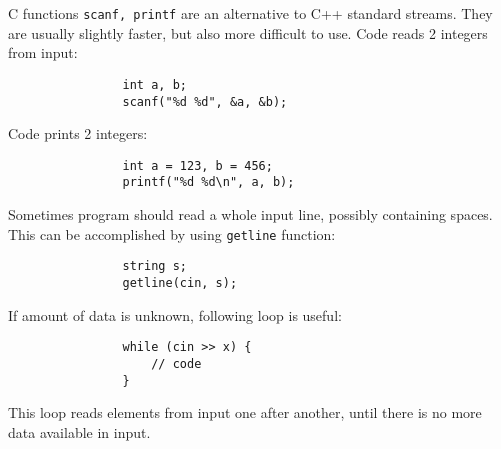 \documentclass{article}
\begin{document}
\begin{itemize}
\begin{itemize}
\begin{itemize}
			C functions {\tt scanf, printf} are an alternative to C++ standard streams. They are usually slightly faster, but also more difficult to use. Code reads 2 integers from input:
			\begin{verbatim}
				int a, b;
				scanf("%d %d", &a, &b);
			\end{verbatim}
			Code prints 2 integers:
			\begin{verbatim}
				int a = 123, b = 456;
				printf("%d %d\n", a, b);
			\end{verbatim}
			Sometimes program should read a whole input line, possibly containing spaces. This can be accomplished by using {\tt getline} function:
			\begin{verbatim}
				string s;
				getline(cin, s);
			\end{verbatim}
			If amount of data is unknown, following loop is useful:
			\begin{verbatim}
				while (cin >> x) {
				    // code
				}
			\end{verbatim}
			This loop reads elements from input one after another, until there is no more data available in input.
			

\end{itemize}
\end{itemize}
\end{itemize}
\end{document}
